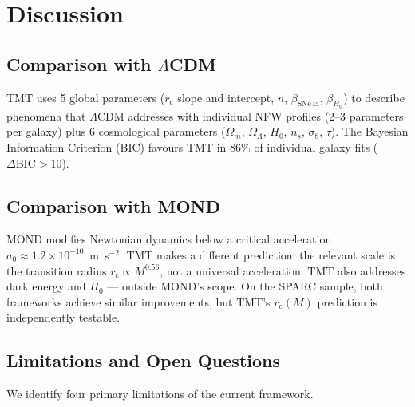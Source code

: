 \documentclass[manuscript,linenumbers]{aastex631}
\newcommand{\rc}{r_{\mathrm{c}}}
\newcommand{\HObs}{H_{\mathrm{0}}}
\begin{document}
\section{Discussion}
\label{sec:discussion}

\subsection{\texorpdfstring{Comparison with $\Lambda$CDM}{Comparison with LambdaCDM}}
\label{sec:comp_lcdm}

TMT uses 5 global parameters ($\rc$ slope and intercept, $n$,
$\beta_{\mathrm{SNe\,Ia}}$, $\beta_{\HObs}$) to describe phenomena that
$\Lambda$CDM addresses with individual NFW profiles (2--3 parameters
per galaxy) plus 6 cosmological parameters
($\Omega_{m}$, $\Omega_{\Lambda}$, $\HObs$, $n_{s}$, $\sigma_{8}$,
$\tau$).  The Bayesian Information Criterion (BIC) favours TMT in
86\% of individual galaxy fits ($\Delta\mathrm{BIC} > 10$).

\subsection{Comparison with MOND}
\label{sec:comp_mond}

MOND \citep{Milgrom1983} modifies Newtonian dynamics below a critical
acceleration $a_{0} \approx 1.2\times10^{-10}$~m~s$^{-2}$.  TMT
makes a different prediction: the relevant scale is the transition
radius $\rc \propto M^{0.56}$, not a universal acceleration.  TMT
also addresses dark energy and $\HObs$ --- outside MOND's scope.  On
the SPARC sample, both frameworks achieve similar improvements, but
TMT's $\rc(M)$ prediction is independently testable.

\subsection{Limitations and Open Questions}
\label{sec:limitations}

We identify four primary limitations of the current framework.
\end{document}
